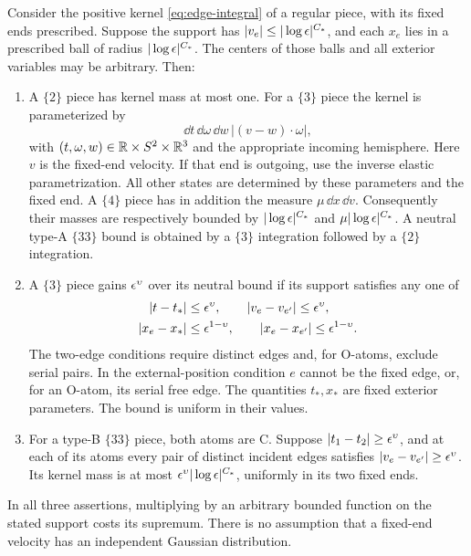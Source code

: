 \begin{lemma}\label{lem:dhm-local}
Consider the positive kernel \eqref{eq:edge-integral} of a regular
piece, with its fixed ends prescribed. Suppose the support has
\(|v_e|\le |\log\epsilon|^{C_*}\), and each \(x_e\) lies in a prescribed
ball of radius \(|\log\epsilon|^{C_*}\). The centers of those balls and
all exterior variables may be arbitrary. Then:
\begin{enumerate}[label=(\roman*)]
 \item A \(\{2\}\) piece has kernel mass at most one. For a
 \(\{3\}\) piece the kernel is parameterized by
 \begin{equation}\label{eq:local-three-parameters}
   \dd t\,\dd\omega\,\dd w\,
         |(v-w)\cdot\omega|,
 \end{equation}
 with \((t,\omega,w)\in\mathbb R\times S^2\times\mathbb R^3\) and the
 appropriate incoming hemisphere. Here \(v\) is the fixed-end
 velocity. If that end is outgoing, use the inverse elastic
 parametrization. All other states are determined by these
 parameters and the fixed end. A \(\{4\}\) piece has in addition
 the measure \(\mu\,\dd x\,\dd v\).
 Consequently their masses are respectively bounded by
 \(|\log\epsilon|^{C_*}\) and
 \(\mu|\log\epsilon|^{C_*}\). A neutral type-A \(\{33\}\) bound is
 obtained by a \(\{3\}\) integration followed by a \(\{2\}\)
 integration.
 \item A \(\{3\}\) piece gains \(\epsilon^\upsilon\) over its neutral
 bound if its support satisfies any one of
 \begin{equation}\label{eq:good-three-conditions}
 \begin{split}
 |t-t_*|&\le\epsilon^\upsilon,\qquad
 |v_e-v_{e'}|\le\epsilon^\upsilon,\\
 |x_e-x_*|&\le\epsilon^{1-\upsilon},\qquad
 |x_e-x_{e'}|\le\epsilon^{1-\upsilon}.
 \end{split}
 \end{equation}
 The two-edge conditions require distinct edges and, for O-atoms,
 exclude serial pairs. In the external-position condition \(e\)
 cannot be the fixed edge, or, for an O-atom, its serial free edge.
 The quantities \(t_*,x_*\) are fixed exterior parameters. The bound
 is uniform in their values.
 \item For a type-B \(\{33\}\) piece, both atoms are C. Suppose
 \(|t_1-t_2|\ge\epsilon^\upsilon\), and at each of its atoms every pair
 of distinct incident edges satisfies
 \(|v_e-v_{e'}|\ge\epsilon^\upsilon\). Its kernel mass is at most
 \(\epsilon^\upsilon|\log\epsilon|^{C_*}\), uniformly in its two fixed
 ends.
\end{enumerate}
In all three assertions, multiplying by an arbitrary bounded function
on the stated support costs its supremum. There is no assumption that
a fixed-end velocity has an independent Gaussian distribution.
\end{lemma}

